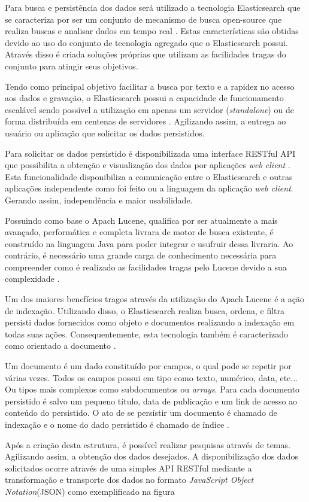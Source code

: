Para busca e persistência dos dados será utilizado a tecnologia Elasticsearch que se caracteriza por ser um conjunto de mecanismo de busca open-source que realiza buscas e analisar dados em tempo real \cite{Gil:2010}. Estas características são obtidas devido ao uso do conjunto de tecnologia agregado que o Elasticsearch possui. Através disso é criada soluções próprias que utilizam as  facilidades tragas do conjunto para atingir seus objetivos.

Tendo como principal objetivo facilitar a busca por texto e a rapidez no acesso aos dados e gravação, o Elasticsearch possui a capacidade de funcionamento escalável sendo possível a utilização em apenas um servidor (\textit{standalone}) ou de forma distribuída em centenas de servidores \cite{Gormley:2015}. Agilizando assim, a entrega ao usuário ou aplicação que solicitar os dados persistidos.

Para solicitar os dados persistido é disponibilizada uma interface RESTful API que possibilita a obtenção e visualização dos dados por aplicações \textit{web client} \cite{Gormley:2015}. Esta funcionalidade disponibiliza a comunicação entre o Elasticsearch e outras aplicações independente como foi feito ou a linguagem da aplicação \textit{web client}. Gerando assim, independência e maior usabilidade.

Possuindo como base o Apach Lucene, qualifica por ser atualmente a mais avançado, performática e completa livrara de motor de busca existente, é construído na linguagem Java para poder integrar e usufruir dessa livraria. Ao contrário, é necessário uma grande carga de conhecimento necessária para compreender como é realizado as facilidades tragas pelo Lucene devido a sua complexidade \cite{Gormley:2015}.

Um dos maiores benefícios tragos através da utilização do Apach Lucene é a ação de indexação. Utilizando disso, o Elasticsearch realiza busca, ordena, e filtra persisti dados fornecidos como objeto e documentos realizando a indexação em todas suas ações. Consequentemente, esta tecnologia também é caracterizado como orientado a documento \cite{Gormley:2015}.

Um documento é um dado constituído por campos, o qual pode se repetir por várias vezes. Todos os campos possui em tipo como texto, numérico, data, etc... Ou tipos mais complexos como subdocumentos ou \textit{arrays}. Para cada documento persistido é salvo um pequeno título, data de publicação e um link de acesso ao conteúdo do persistido. O ato de se persistir um documento é chamado de indexação e o nome do dado persistido é chamado de índice \cite{Kuc:2013}.

Após a criação desta estrutura, é possível realizar pesquisas através de temas. Agilizando assim, a obtenção dos dados desejados. A disponibilização dos dados solicitados ocorre através de uma simples API RESTful mediante a transformação e transporte dos dados no formato \textit{JavaScript Object Notation}(JSON) como exemplificado na figura
